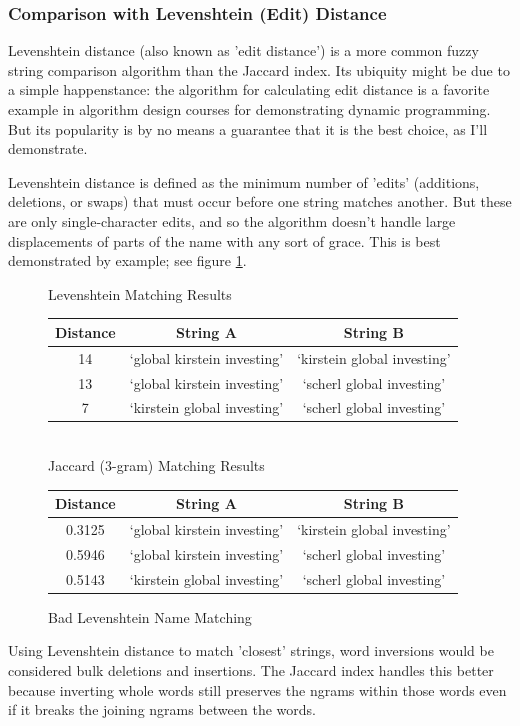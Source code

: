 \documentclass[11pt]{article}
\begin{document}
\subsubsection{Comparison with Levenshtein (Edit) Distance}
Levenshtein distance (also known as 'edit distance') is a more common fuzzy string comparison algorithm
than the Jaccard index. 
Its ubiquity might be due to a simple happenstance: the algorithm for calculating edit distance is
a favorite example in algorithm design courses for demonstrating dynamic programming.
But its popularity is by no means a guarantee that it is the best choice, as I'll demonstrate.

Levenshtein distance is defined as \cite{levenshtein} the minimum number of 'edits' 
(additions, deletions, or swaps) that must occur before one string matches another.
But these are only single-character edits, and so the algorithm doesn't handle large displacements
of parts of the name with any sort of grace.
This is best demonstrated by example; see figure \ref{fig:lev_comp}.

\begin{figure}[h!]
\centering
Levenshtein Matching Results\\
\begin{tabular}{c|c|c}
  Distance & String A & String B \\
\hline
  14 & `global kirstein investing' & `kirstein global investing' \\
  13 & `global kirstein investing' & `scherl global investing' \\
  7 & `kirstein global investing' & `scherl global investing'
\end{tabular}
\\
Jaccard (3-gram) Matching Results\\
\begin{tabular}{c|c|c}
  Distance & String A & String B \\
\hline
  0.3125 & `global kirstein investing' & `kirstein global investing' \\
  0.5946 & `global kirstein investing' & `scherl global investing' \\
  0.5143 & `kirstein global investing' & `scherl global investing'
\end{tabular}
\caption{Bad Levenshtein Name Matching}
\label{fig:lev_comp}
\end{figure}

Using Levenshtein distance to match 'closest' strings, word 
inversions would be considered bulk deletions and insertions. 
The Jaccard index handles this better because inverting whole words 
still preserves the ngrams within those words even if it breaks
the joining ngrams between the words.
\end{document}
